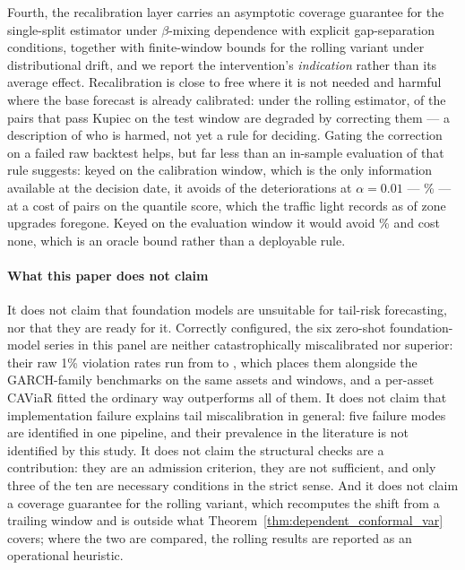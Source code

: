 \documentclass[preprint,11pt,authoryear]{elsarticle}
\newcommand{\1}{\boldsymbol{1}}
\begin{document}
Fourth, the recalibration layer carries an asymptotic coverage guarantee for
the single-split estimator under $\beta$-mixing dependence with explicit
gap-separation conditions, together with finite-window bounds for the rolling
variant under distributional drift, and we report the intervention's
\emph{indication} rather than its average effect. Recalibration is close to free
where it is not needed and harmful where the base forecast is already calibrated:
under the rolling estimator, \nWellCalRollWorse{} of the \nWellCalRollN{} pairs
that pass Kupiec on the test window are degraded by correcting them --- a
description of who is harmed, not yet a rule for deciding. Gating the correction
on a failed raw backtest helps, but far less than an in-sample evaluation of that
rule suggests: keyed on the calibration window, which is the only information
available at the decision date, it avoids \nGateRollAvoided{} of the
\nDegradedRoll{} deteriorations at $\alpha = 0.01$ ---
\nGateRollAvoidedPct\% --- at a cost of \nGateRollUpgradesLostNet{} pairs on the
quantile score, which the traffic light records as \nGateRollUpgradesLost{} of
\nGateRollUpgrades{} zone upgrades foregone. Keyed on the evaluation window it would
avoid \nGateRollOracleAvoidedPct\% and cost none, which is an oracle bound rather
than a deployable rule.

\paragraph{What this paper does not claim} It does not claim that foundation
models are unsuitable for tail-risk forecasting, nor that they are ready for it.
Correctly configured, the six zero-shot foundation-model series in this panel are
neither catastrophically miscalibrated nor superior: their raw 1\% violation
rates run from \nRawPiTimesFM{} to \nRawPiLagLlama, which places them alongside
the GARCH-family benchmarks on the same assets and windows, and a per-asset
CAViaR \citep{engle2004caviar} fitted the ordinary way outperforms all of them.
It does not claim that implementation failure explains tail miscalibration in
general: five failure modes are identified in one pipeline, and their prevalence
in the literature is not identified by this study. It does not claim the
structural checks are a contribution: they are an admission criterion, they are
not sufficient, and only three of the ten are necessary conditions in the strict
sense. And it does not claim a coverage guarantee for the rolling variant, which
recomputes the shift from a trailing window and is outside what
Theorem~\ref{thm:dependent_conformal_var} covers; where the two are compared, the
rolling results are reported as an operational heuristic.
\end{document}

